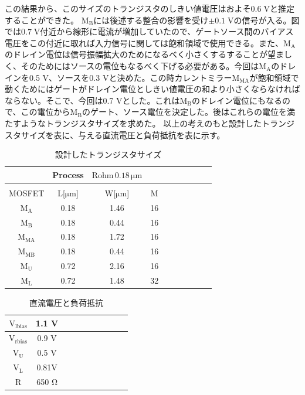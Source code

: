 \documentclass[twocolumn]{jsarticle}
\begin{document}
        この結果から、このサイズのトランジスタのしきい値電圧はおよそ$0.6\;\mathrm{V}$と推定することができた。
        $\mathrm{M_{B}}$には後述する整合の影響を受け$\pm0.1\;\mathrm{V}$の信号が入る。図では$0.7\;\mathrm{V}$付近から線形に電流が増加していたので、ゲートソース間のバイアス電圧をこの付近に取れば入力信号に関しては飽和領域で使用できる。また、$\mathrm{M_{A}}$のドレイン電位は信号振幅拡大のためになるべく小さくするすることが望ましく、そのためにはソースの電位もなるべく下げる必要がある。今回は$\mathrm{M_{A}}$のドレインを0.5 V、ソースを0.3 Vと決めた。この時カレントミラー$\mathrm{M_{MA}}$が飽和領域で動くためにはゲートがドレイン電位としきい値電圧の和より小さくならなければならない。そこで、今回は0.7 Vとした。これは$\mathrm{M_{B}}$のドレイン電位にもなるので、この電位から$\mathrm{M_{B}}$のゲート、ソース電位を決定した。後はこれらの電位を満たすようなトランジスタサイズを求めた。    以上の考えのもと設計したトランジスタサイズを表に、与える直流電圧と負荷抵抗を表に示す。
        \begin{table}[H]
        \caption{設計したトランジスタサイズ}
        \label{table:size}
        \centering
        \begin{tabular}{cccccccccc}
        \hline
        &Process&$\mathrm{Rohm\,0.18\,\mu m}$&\\
        \hline
        &&&\\
        MOSFET & L[$\mathrm{\mu m}$] & W[$\mathrm{\mu m}$] & M\\
        \hline \hline
        $\mathrm{M_{A}}$ & 0.18 & 1.46 & 16 \\
        $\mathrm{M_{B}}$ & 0.18 & 0.44 & 16 \\
        $\mathrm{M_{MA}}$& 0.18 & 1.72 & 16 \\
        $\mathrm{M_{MB}}$& 0.18 & 0.44 & 16 \\
        $\mathrm{M_{U}}$ & 0.72 & 2.16 & 16 \\
        $\mathrm{M_{L}}$ & 0.72 & 1.48 & 32 \\            
        \end{tabular}
        \end{table}
        \begin{table}[H]
        \caption{直流電圧と負荷抵抗}
        \label{table:bias}
        \centering
        \begin{tabular}{cccccccccc}
        $\mathrm{V_{lbias}}$ & 1.1 V\\\hline
        $\mathrm{V_{rbias}}$ & 0.9 V \\\hline
        $\mathrm{V_{U}}$     & 0.5 V  \\\hline
        $\mathrm{V_{L}}$     & 0.81V  \\\hline
        $\mathrm{R}$         & 650 $\mathrm{\Omega}$  
                \end{tabular}
        \end{table}
\end{document}
